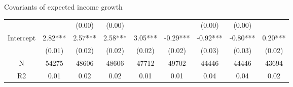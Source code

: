 \documentclass{beamer}
\begin{document}
\begin{frame}{Covariants of expected income growth}
\begin{table}
{\begin{tabular}{ccccccccc}
				&           &    (0.00) &     (0.00) &             &           &     (0.00) &      (0.00) &              \\
				Intercept        &   2.82*** &   2.57*** &    2.58*** &     3.05*** &  -0.29*** &   -0.92*** &    -0.80*** &      0.20*** \\
				&    (0.01) &    (0.02) &     (0.02) &      (0.02) &    (0.02) &     (0.03) &      (0.03) &       (0.02) \\
				\hline 
				N                &     54275 &     48606 &      48606 &       47712 &     49702 &      44446 &       44446 &        43694 \\
				R2               &      0.01 &      0.02 &       0.02 &        0.01 &      0.01 &       0.04 &        0.04 &         0.02 \\
				
				\hline 
			\end{tabular}
		}
	\end{table}
\end{frame}



\end{document}
